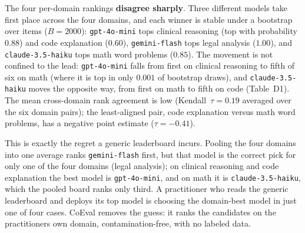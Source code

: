 The four per-domain rankings \textbf{disagree sharply}. Three different models take first place across the four
domains, and each winner is stable under a bootstrap over items (\(B=2000\)): \texttt{gpt-4o-mini} tops clinical
reasoning (top with probability \(0.88\)) and code explanation (\(0.60\)), \texttt{gemini-flash} tops legal analysis
(\(1.00\)), and \texttt{claude-3.5-haiku} tops math word problems (\(0.85\)). The movement is not confined to the lead:
\texttt{gpt-4o-mini} falls from first on clinical reasoning to fifth of six on math (where it is top in only
\(0.001\) of bootstrap draws), and \texttt{claude-3.5-haiku} moves the opposite way, from first on math to fifth on
code (Table~D1). The mean cross-domain rank agreement is low (Kendall~\(\tau = 0.19\) averaged over the six
domain pairs); the least-aligned pair, code explanation versus math word problems, has a negative point estimate
(\(\tau = -0.41\)).

This is exactly the regret a generic leaderboard incurs. Pooling the four domains into one average ranks
\texttt{gemini-flash} first, but that model is the correct pick for only one of the four domains (legal analysis);
on clinical reasoning and code explanation the best model is \texttt{gpt-4o-mini}, and on math it is
\texttt{claude-3.5-haiku}, which the pooled board ranks only third. A practitioner who reads the generic
leaderboard and deploys its top model is choosing the domain-best model in just one of four cases. CoEval removes the
guess: it ranks the candidates on the practitioner\textquotesingle s own domain, contamination-free, with no labeled data.

